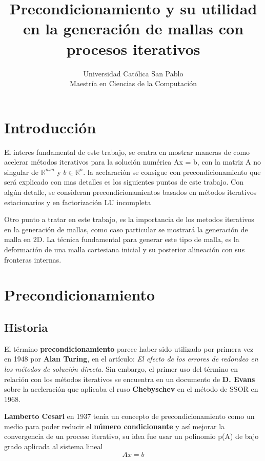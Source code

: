 \documentclass[11pt,letterpaper]{article}
\title{Precondicionamiento y su utilidad en la generación de mallas con procesos iterativos}
\author{\Large{Universidad Católica San Pablo}
	\\ \large{Maestría en Ciencias de la Computación }
}
\begin{document}
\maketitle


\tableofcontents

\section*{Introducción}

El interes fundamental de este trabajo, se centra en mostrar maneras de como acelerar métodos iterativos para la solución numérica Ax = b, con la matriz A no singular de  $\mathbb{R}^{nxn}$ y  $ b\in\mathbb{R}^n$. la acelaración se consigue con precondicionamiento que será explicado con mas detalles es los siguientes puntos de este trabajo.  Con algún detalle, se consideran precondicionamientos basados en métodos iterativos estacionarios y en factorización LU incompleta

Otro punto a tratar en este trabajo, es la importancia de los metodos iterativos en la generación de mallas, como caso particular se mostrará la generación de malla en 2D. La técnica fundamental para generar este tipo de malla, es la deformación de una malla cartesiana inicial y su posterior alineación con sus fronteras internas.


\section{Precondicionamiento}

\subsection{Historia}

El término \textbf{precondicionamiento} parece haber sido utilizado por primera vez en 1948 por \textbf{Alan Turing}, en el artículo: \textit{El efecto de los errores de redondeo en los métodos de solución directa}. Sin embargo, el primer uso del término en relación con los métodos iterativos se encuentra en un documento de \textbf{D. Evans} sobre la aceleración que aplicaba el ruso \textbf{Chebyschev} en el método de SSOR en 1968.

\textbf{Lamberto Cesari} en 1937 tenía un concepto de precondicionamiento como un medio para poder reducir el \textbf{número condicionante} y así mejorar la convergencia de un proceso iterativo, su idea fue usar un polinomio p(A) de bajo grado aplicada al sistema lineal 
\[
 Ax = b \tag{1} %
\]
\end{document}
